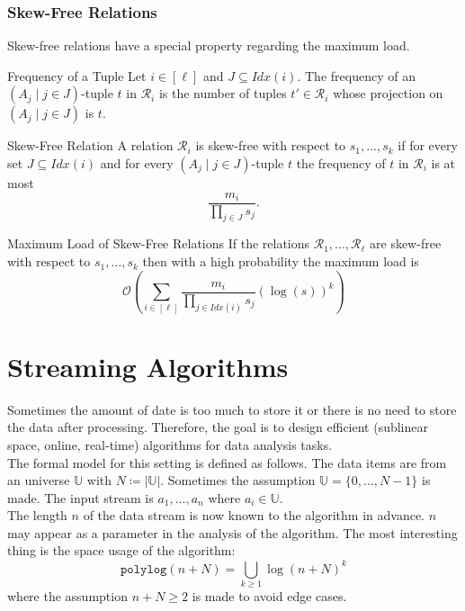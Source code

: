 \documentclass{panikzettel}
\begin{document}
\subsubsection{Skew-Free Relations}
Skew-free relations have a special property regarding the maximum load.

\begin{defi}{Frequency of a Tuple}
Let $i\in[\ell]$ and $J\subseteq Idx(i)$. The frequency of an $(A_j\mid j\in J)$-tuple $t$ in $\mathcal{R}_i$ is the number of tuples $t'\in\mathcal{R}_i$ whose projection on $(A_j\mid j\in J)$ is $t$.
\end{defi}

\begin{halfboxl}
\vspace{-\baselineskip}
	\begin{defi}{Skew-Free Relation}
	A relation $\mathcal{R}_i$ is skew-free with respect to $s_1,...,s_k$ if for every set $J\subseteq Idx(i)$ and for every $(A_j \mid j\in J)$-tuple $t$ the frequency of $t$ in $\mathcal{R}_i$ is at most
	\[
	\frac{m_i}{\prod_{j\in J}s_j}.
	\]
	\end{defi}
\end{halfboxl}
\begin{halfboxr}
\vspace{-\baselineskip}
	\begin{theo}{Maximum Load of Skew-Free Relations}
	If the relations $\mathcal{R}_1,...,\mathcal{R}_\ell$ are skew-free with respect to $s_1,...,s_k$ then with a high probability the maximum load is
	\[
	\mathcal{O}\left(\sum_{i\in [\ell]} \frac{m_i}{\prod_{j\in Idx(i)} s_j}(\log(s))^k \right)
	\]
	\end{theo}
\end{halfboxr}


\section{Streaming Algorithms}
Sometimes the amount of date is too much to store it or there is no need to store the data after processing. Therefore, the goal is to design efficient (sublinear space, online, real-time) algorithms for data analysis tasks.\\

The formal model for this setting is defined as follows. The data items are from an universe $\mathbb{U}$ with $N\coloneqq |\mathbb{U}|$. Sometimes the assumption $\mathbb{U}=\{0,\ldots, N-1 \}$ is made. The input stream is $a_1,...,a_n$ where $a_i\in \mathbb{U}$.\\
The length $n$ of the data stream is now known to the algorithm in advance. $n$ may appear as a parameter in the analysis of the algorithm. The most interesting thing is the space usage of the algorithm:
\[
\texttt{polylog}(n+N)=\underset{k\geq 1}{\bigcup} \log (n+N)^k
\]
where the assumption $n+N\geq 2$ is made to avoid edge cases.
\end{document}
